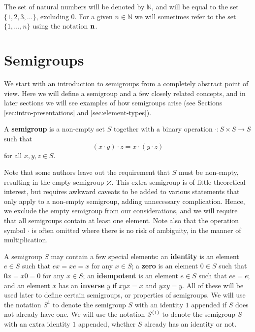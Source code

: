 The set of natural numbers will be denoted by $\mathbb{N}$, and will be equal to
the set $\{1, 2, 3, \ldots\}$, excluding $0$.  For a given $n \in \mathbb{N}$ we
will sometimes refer to the set $\{1, \ldots, n\}$ using the notation $\mathbf{n}$.

\section{Semigroups}
\label{sec:intro-semigroups}
We start with an introduction to semigroups from a completely abstract point of
view.  Here we will define a semigroup and a few closely related concepts, and
in later sections we will see examples of how semigroups arise (see Sections
\ref{sec:intro-presentations} and \ref{sec:element-types}).

\begin{definition}
  \label{def:semigroup}
  A \textbf{semigroup} is a non-empty set $S$ together with
  a binary operation $\cdot: S \times S \to S$ such that
  $$(x \cdot y) \cdot z = x \cdot (y \cdot z)$$
  for all $x, y, z \in S$.
\end{definition}
Note that some authors leave out the requirement that $S$ must be non-empty,
resulting in the empty semigroup $\varnothing$.  This extra semigroup is of
little theoretical interest, but requires awkward caveats to be added to various
statements that only apply to a non-empty semigroup, adding unnecessary
complication.  Hence, we exclude the empty semigroup from our considerations,
and we will require that all semigroups contain at least one element.  Note also
that the operation symbol $\cdot$ is often omitted where there is no risk of
ambiguity, in the manner of multiplication.

A semigroup $S$ may contain a few special elements: an \textbf{identity} is an
element $e \in S$ such that $ex = xe = x$ for any $x \in S$; a \textbf{zero} is
an element $0 \in S$ such that $0x = x0 = 0$ for any $x \in S$; an
\textbf{idempotent} is an element $e \in S$ such that $ee=e$; and an element $x$
has an \textbf{inverse} $y$ if $xyx = x$ and $yxy=y$.  All of these will
be used later to define certain semigroups, or properties of semigroups.  We
will use the notation $S^1$ to denote the semigroup $S$ with an identity $1$
appended if $S$ does not already have one.  We will use the notation $S^{(1)}$
to denote the semigroup $S$ with an extra identity $1$ appended, whether $S$
already has an identity or not.
  

